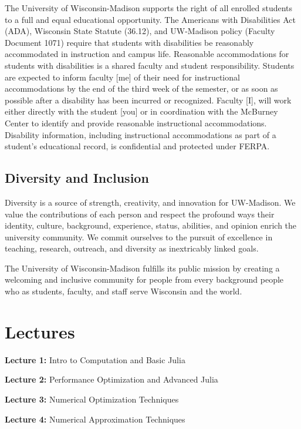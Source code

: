 \documentclass[
]{book}
\begin{document}
The University of Wisconsin-Madison supports the right of all enrolled students to a full and equal educational opportunity. The Americans with Disabilities Act (ADA), Wisconsin State Statute (36.12), and UW-Madison policy (Faculty Document 1071) require that students with disabilities be reasonably accommodated in instruction and campus life. Reasonable accommodations for students with disabilities is a shared faculty and student responsibility. Students are expected to inform faculty {[}me{]} of their need for instructional accommodations by the end of the third week of the semester, or as soon as possible after a disability has been incurred or recognized. Faculty {[}I{]}, will work either directly with the student {[}you{]} or in coordination with the McBurney Center to identify and provide reasonable instructional accommodations. Disability information, including instructional accommodations as part of a student's educational record, is confidential and protected under FERPA.

\hypertarget{diversity-and-inclusion}{%
\section{Diversity and Inclusion}\label{diversity-and-inclusion}}

Diversity is a source of strength, creativity, and innovation for UW-Madison. We value the contributions of each person and respect the profound ways their identity, culture, background, experience, status, abilities, and opinion enrich the university community. We commit ourselves to the pursuit of excellence in teaching, research, outreach, and diversity as inextricably linked goals.

The University of Wisconsin-Madison fulfills its public mission by creating a welcoming and inclusive community for people from every background people who as students, faculty, and staff serve Wisconsin and the world.

\hypertarget{lectures}{%
\chapter{Lectures}\label{lectures}}

\textbf{Lecture 1:} Intro to Computation and Basic Julia

\textbf{Lecture 2:} Performance Optimization and Advanced Julia

\textbf{Lecture 3:} Numerical Optimization Techniques

\textbf{Lecture 4:} Numerical Approximation Techniques
\end{document}
